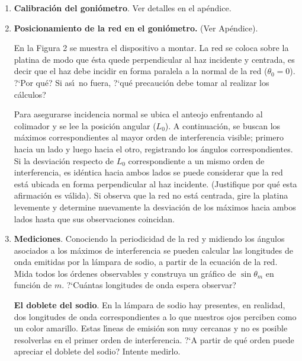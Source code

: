 \documentclass[laboratorio]{guia}
\begin{document}
\begin{enumerate}
    \item {\bf Calibraci\'on del goni\'ometro}. Ver detalles en el ap\'endice.
    \item {\bf Posicionamiento de la red en el goni\'ometro.} (Ver Ap\'endice). 

        En la Figura 2 se muestra el dispositivo a montar. La red se coloca 
        sobre la platina de modo que \'esta quede perpendicular al haz 
        incidente y centrada, es decir que el haz debe incidir en forma 
        paralela a la normal de la red ($\theta_0 = 0$). ?`Por qu\'e? Si 
        as\'\i\ no fuera, ?`qu\'e precauci\'on debe tomar al realizar los 
        c\'alculos?

        Para asegurarse incidencia normal se ubica el anteojo enfrentando al 
        colimador y se lee la posici\'on angular ($L_0$). A continuaci\'on, 
        se buscan los m\'aximos correspondientes al mayor orden de 
        interferencia visible; primero hacia un lado y luego hacia el otro,
        registrando los \'angulos correspondientes. Si la desviaci\'on respecto
        de $L_0$ correspondiente a un mismo orden de interferencia, es 
        id\'entica hacia ambos lados se puede considerar que la red est\'a 
        ubicada en forma perpendicular al haz incidente. (Justifique por qu\'e
        esta afirmaci\'on es v\'alida). Si observa que la red no est\'a 
        centrada, gire la platina levemente y determine nuevamente la 
        desviaci\'on de los m\'aximos hacia ambos lados hasta que sus 
        observaciones coincidan.

    \item {\bf Mediciones}. Conociendo la periodicidad de la red y midiendo los
        \'angulos asociados a los  m\'aximos de interferencia se pueden 
        calcular las longitudes de onda emitidas por la l\'ampara de sodio, a
        partir de la ecuaci\'on de la red. Mida todos los \'ordenes observables
        y construya un gr\'afico de $\sin \theta_m$ en funci\'on de $m$. 
        ?`Cu\'antas longitudes de onda espera observar?
        
        {\bf El doblete del sodio}. En la l\'ampara de sodio hay presentes,
        en realidad, dos longitudes 
        de onda correspondientes a lo que nuestros ojos perciben como un 
        color amarillo. Estas l\'\i neas de emisi\'on son muy cercanas y no es
        posible resolverlas en el primer orden de interferencia. 
        ?`A partir de qu\'e orden puede apreciar el doblete del sodio? 
        Intente medirlo.
\end{enumerate}
\end{document}
